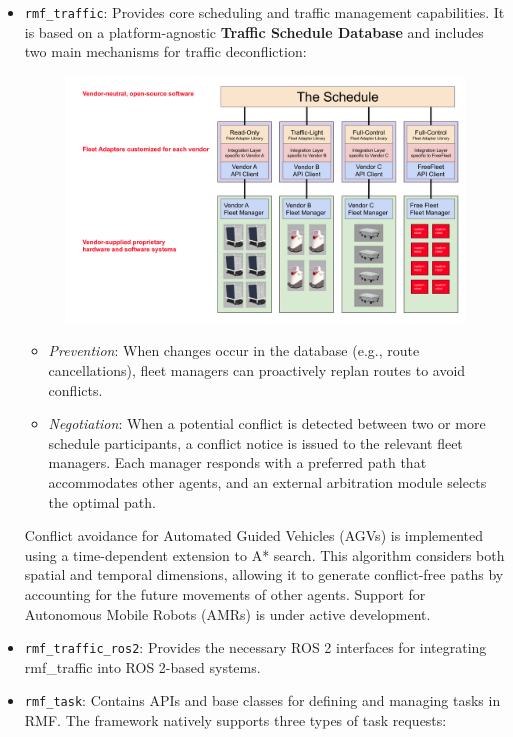\begin{itemize}
	\item \texttt{rmf\_traffic}: Provides core scheduling and traffic management capabilities. It is based on a platform-agnostic \textbf{Traffic Schedule Database} and includes two main mechanisms for traffic deconfliction:
	\begin{figure}[h]
		\centering
		\includegraphics[width=0.8\linewidth]{img/RMF_tut_schedule.png}
		\label{fig:Open-RMF Schedule structure}
	\end{figure}
		\begin{itemize}
			\item \textit{Prevention}: When changes occur in the database (e.g., route cancellations), fleet managers can proactively replan routes to avoid conflicts.
			\item \textit{Negotiation}: When a potential conflict is detected between two or more schedule participants, a conflict notice is issued to the relevant fleet managers. Each manager responds with a preferred path that accommodates other agents, and an external arbitration module selects the optimal path.
		\end{itemize}
	Conflict avoidance for Automated Guided Vehicles (AGVs) is implemented using a time-dependent extension to A* search. This algorithm considers both spatial and temporal dimensions, allowing it to generate conflict-free paths by accounting for the future movements of other agents. Support for Autonomous Mobile Robots (AMRs) is under active development.
	\item \texttt{rmf\_traffic\_ros2}: Provides the necessary ROS 2 interfaces for integrating rmf\_traffic into ROS 2-based systems.
	\item \texttt{rmf\_task}: Contains APIs and base classes for defining and managing tasks in RMF.
	The framework natively supports three types of task requests:

\end{itemize}
